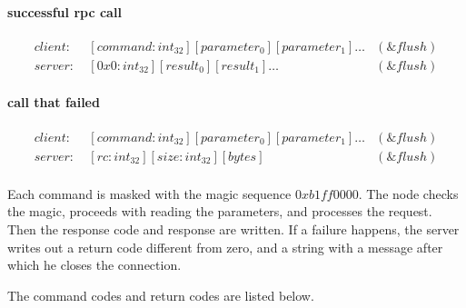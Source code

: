 \paragraph{successful rpc call}
\begin{equation*}
\begin{aligned}
client: \ & [command:int_{32}][parameter_0][parameter_1]\ldots & (\&flush) \\
server: \ & [0x0:int_{32}][result_0][result_1]\ldots & (\&flush)
\end{aligned}
\end{equation*}
\paragraph{call that failed}

\begin{equation*}
\begin{aligned}
client: \ & [command : int_{32}][parameter_0][parameter_1]\ldots & (\&flush) \\
server: \ & [rc:int_{32}][size:int_{32}][bytes] & (\&flush) \\
\end{aligned}
\end{equation*}

Each command is masked with the magic sequence $0xb1ff0000$.
The node checks the magic, proceeds with reading the parameters, and processes the request.
Then the response code and response are written.
If a failure happens, the server writes out a return code different from zero, and a string with a message after which he closes the connection.

The command codes and return codes are listed below.

